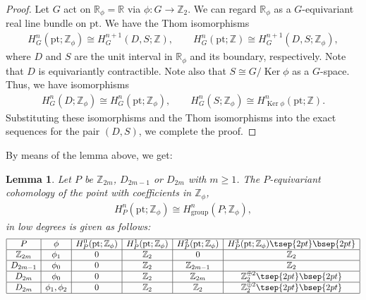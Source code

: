 \documentclass[pdftex]{sigma}
\newtheorem{lem}[thm]{Lemma}
\theoremstyle{definition}
\newcommand{\R}{\mathbb{R}}
\newcommand{\Z}{\mathbb{Z}}
\newcommand{\pt}{\mathrm{pt}}
\begin{document}
\begin{proof}
Let $G$ act on $\R_\phi = \R$ via $\phi \colon G \to \Z_2$. We can regard $\R_\phi$ as a $G$-equivariant real line bundle on $\pt$. We have the Thom isomorphisms
\begin{gather*}
H^n_G(\pt; \Z_\phi) \cong H^{n+1}_G(D, S; \Z), \qquad H^n_G(\pt; \Z) \cong H^{n+1}_G(D, S; \Z_\phi),
\end{gather*}
where $D$ and $S$ are the unit interval in $\R_\phi$ and its boundary, respectively. Note that $D$ is equivariantly contractible. Note also that $S \cong G/\operatorname{Ker}\phi$ as a $G$-space. Thus, we have isomorphisms
\begin{gather*}
H^n_G(D; \Z_\phi) \cong H^n_G(\pt; \Z_\phi), \qquad H^n_G(S; \Z_\phi) \cong H^n_{\operatorname{Ker}\phi}(\pt; \Z).
\end{gather*}
Substituting these isomorphisms and the Thom isomorphisms into the exact sequences for the pair $(D, S)$, we complete the proof.
\end{proof}

By means of the lemma above, we get:

\begin{lem} \label{lem:cohomology_of_point_twisted_case}
Let $P$ be $\Z_{2m}$, $D_{2m-1}$ or $D_{2m}$ with $m \ge 1$. The $P$-equivariant cohomology of the point with coefficients in $\Z_\phi$,
\begin{gather*}
H^n_P(\pt; \Z_\phi) \cong H^n_{\mathrm{group}}(P; \Z_\phi),
\end{gather*}
in low degrees is given as follows:
$$
\begin{array}{|c|c|c|c|c|c|}
\hline
P & \phi &
H^0_P(\pt; \Z_\phi) & H^1_P(\pt; \Z_\phi) &
H^2_P(\pt; \Z_\phi) & H^3_P(\pt; \Z_\phi) \tsep{2pt}\bsep{2pt}\\
\hline
\Z_{2m} & \phi_1 &
0 & \Z_2 & 0 & \Z_2 \\
\hline
D_{2m-1} & \phi_0 &
0 & \Z_2 & \Z_{2m-1} & \Z_2 \\
\hline
D_{2m} & \phi_0 &
0 & \Z_2 & \Z_{2m} & \Z_2^{\oplus 2} \tsep{2pt}\bsep{2pt}\\
\hline
D_{2m} & \phi_1, \phi_2 &
0 & \Z_2 & \Z_2 & \Z_2^{\oplus 2} \tsep{2pt}\bsep{2pt}\\
\hline
\end{array}
$$
\end{lem}
\end{document}
